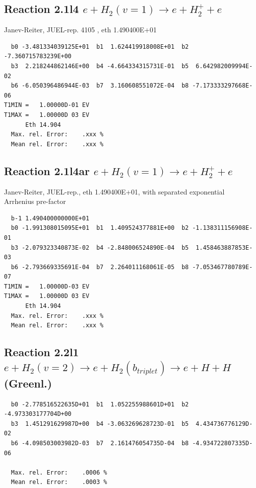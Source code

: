 \documentclass[12pt,dvipdfmx]{article}
\begin{document}
\subsection{
Reaction 2.1l4
 $ e + H_2(v=1) \rightarrow e + H_2^+ + e$
}
Janev-Reiter, JUEL-rep. 4105 \cite{kn:JRS}, eth 1.490400E+01

\begin{small}\begin{verbatim}
  b0 -3.481334039125E+01  b1  1.624419918008E+01  b2 -7.360715783239E+00
  b3  2.218244862146E+00  b4 -4.664334315731E-01  b5  6.642982009994E-02
  b6 -6.050396486944E-03  b7  3.160608551072E-04  b8 -7.173333297668E-06
T1MIN =   1.00000D-01 EV
T1MAX =   1.00000D 03 EV
      Eth 14.904
  Max. rel. Error:    .xxx %
  Mean rel. Error:    .xxx %
\end{verbatim}\end{small}

\subsection{
Reaction 2.1l4ar
 $ e + H_2(v=1) \rightarrow e + H_2^+ + e$
}
Janev-Reiter, JUEL-rep., eth 1.490400E+01,
with separated exponential Arrhenius pre-factor

\begin{small}\begin{verbatim}
  b-1 1.490400000000E+01
  b0 -1.991308015095E+01  b1  1.409524377881E+00  b2 -1.138311156908E-01
  b3 -2.079323340873E-02  b4 -2.848006524890E-04  b5  1.458463887853E-03
  b6 -2.793669335691E-04  b7  2.264011168061E-05  b8 -7.053467780789E-07
T1MIN =   1.00000D-03 EV
T1MAX =   1.00000D 03 EV
      Eth 14.904
  Max. rel. Error:    .xxx %
  Mean rel. Error:    .xxx %
\end{verbatim}\end{small}

\newpage
\subsection{
Reaction 2.2l1
$ e + H_2(v=2) \rightarrow e + H_2(b_{triplet})\rightarrow e + H + H $ (Greenl.)
}


\begin{small}\begin{verbatim}
  b0 -2.778516522635D+01  b1  1.052255988601D+01  b2 -4.973303177704D+00
  b3  1.451291629987D+00  b4 -3.063269628723D-01  b5  4.434736776129D-02
  b6 -4.098503003982D-03  b7  2.161476054735D-04  b8 -4.934722807335D-06

  Max. rel. Error:    .0006 %
  Mean rel. Error:    .0003 %
\end{verbatim}\end{small}
\end{document}
